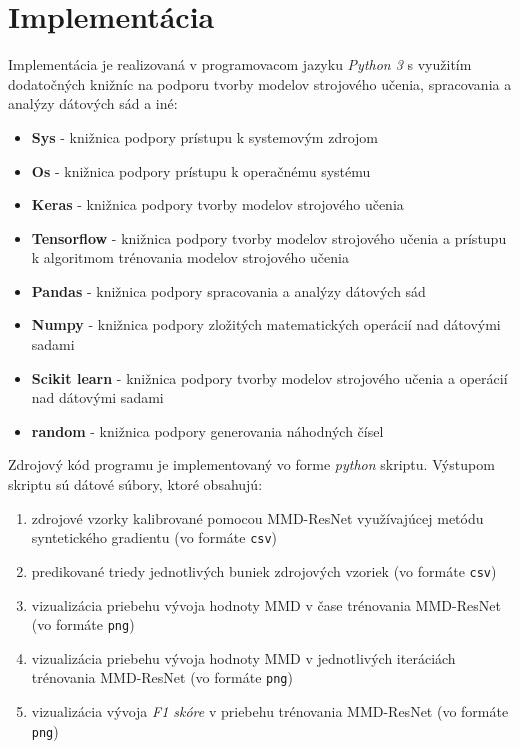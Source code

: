 \chapter{Implementácia}  %
\label{implementacia}

Implementácia je realizovaná v programovacom jazyku \textit{Python 3} s využitím dodatočných knižníc na podporu tvorby modelov strojového učenia, spracovania a analýzy dátových sád a iné:
\begin{itemize}
    \item \textbf{Sys} - knižnica podpory prístupu k systemovým zdrojom
    \item \textbf{Os} -  knižnica podpory prístupu k operačnému systému
    \item \textbf{Keras} - knižnica podpory tvorby modelov strojového učenia
    \item \textbf{Tensorflow} - knižnica podpory tvorby modelov strojového učenia a prístupu k algoritmom trénovania modelov strojového učenia
    \item \textbf{Pandas} - knižnica podpory spracovania a analýzy dátových sád
    \item \textbf{Numpy} - knižnica podpory zložitých matematických operácií nad dátovými sadami
    \item \textbf{Scikit learn} - knižnica podpory tvorby modelov strojového učenia a operácií nad dátovými sadami
    \item \textbf{random} - knižnica podpory generovania náhodných čísel
\end{itemize}

Zdrojový kód programu je implementovaný vo forme \textit{python} skriptu. Výstupom skriptu sú dátové súbory, ktoré obsahujú:
\begin{enumerate}
    \item zdrojové vzorky kalibrované pomocou MMD-ResNet využívajúcej metódu syntetického gradientu (vo formáte \texttt{csv})
    \item predikované triedy jednotlivých buniek zdrojových vzoriek (vo formáte \texttt{csv})
    \item vizualizácia priebehu vývoja hodnoty MMD v čase trénovania MMD-ResNet (vo formáte \texttt{png})
    \item vizualizácia priebehu vývoja hodnoty MMD v jednotlivých iteráciách trénovania MMD-ResNet (vo formáte \texttt{png})
    \item vizualizácia vývoja \textit{F1 skóre} v priebehu trénovania MMD-ResNet (vo formáte \texttt{png})
\end{enumerate}

